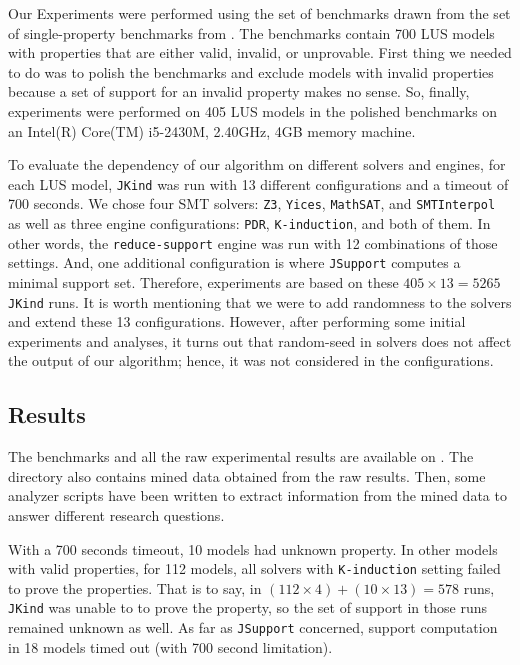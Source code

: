 Our Experiments were performed using the set of benchmarks drawn from the set of single-property benchmarks from \cite{benchmarks}. The benchmarks contain 700 LUS models with properties that are either valid, invalid, or unprovable. First thing we needed to do was to polish the benchmarks and exclude models with invalid properties because a set of support for an invalid property makes no sense. So, finally, experiments were performed on 405 LUS models in the polished benchmarks on an Intel(R) Core(TM) i5-2430M, 2.40GHz, 4GB memory machine.

To evaluate the dependency of our algorithm on different solvers and engines, for each LUS model, \texttt{JKind} was run with 13 different configurations and a timeout of 700 seconds. We chose four SMT solvers: \texttt{Z3}, \texttt{Yices}, \texttt{MathSAT}, and \texttt{SMTInterpol} as well as three engine configurations: \texttt{PDR}, 
\texttt{K-induction}, and both of them. In other words, the \texttt{reduce-support} engine was run with 12 combinations of those settings. And, one additional configuration is where \texttt{JSupport} computes a minimal support set. Therefore, experiments are based on these $405 \times 13 = 5265$ \texttt{JKind} runs. It is worth mentioning that we were to add randomness to the solvers and extend these 13 configurations. However, after performing some initial experiments and analyses, it turns out that random-seed in solvers does not affect the output of our algorithm; hence, it was not considered in the configurations.

\subsection{Results}
The benchmarks and all the raw experimental results are available on \cite{expr}. The directory also contains mined data obtained from the raw results. Then, some analyzer scripts have been written to extract information from the mined data to answer different research questions.

With a 700 seconds timeout, 10 models had unknown property. In other models with valid properties, for 112 models, all solvers with \texttt{K-induction} setting failed to prove the properties. That is to say, in $(112 \times 4) + (10 \times 13) = 578$ runs, \texttt{JKind} was unable to to prove the property, so the set of support in those runs remained unknown as well. As far as \texttt{JSupport} concerned, support computation in 18 models timed out (with 700 second limitation).




